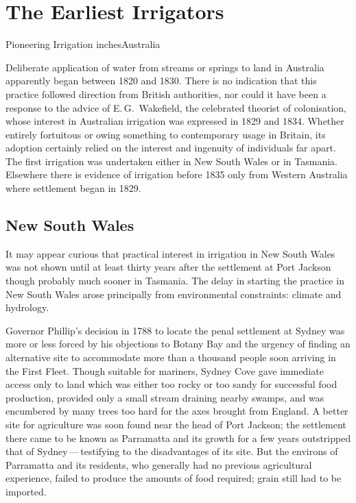 
\setcounter{endnote}{0}

\chapter{The Earliest Irrigators}
\label{ch:early}
{Pioneering Irrigation inchesAustralia}

Deliberate application of water from streams or springs to land in
Australia apparently began between 1820 and 1830.  There is no
indication that this practice followed direction from British
authorities, nor could it have been a response to the advice of
E.\,G.~Wakefield, the celebrated theorist of
colonisation, whose interest in Australian irrigation was expressed in
1829 and 1834.  Whether entirely fortuitous or owing something to
contemporary usage in Britain, its adoption certainly relied on the
interest and ingenuity of individuals far apart.  The first irrigation
was undertaken either in New South Wales or in Tasmania.  Elsewhere
there is evidence of irrigation before 1835 only from Western
Australia where settlement began in 1829.

\section*{\textsf{New South Wales}}
\label{sec:nsw}

It may appear curious that practical interest in irrigation in New
South Wales was not shown until at least thirty years after the
settlement at Port Jackson though probably much sooner in Tasmania.
The delay in starting the practice in New South Wales arose
principally from environmental constraints: climate and hydrology.

Governor Phillip's decision in 1788 to locate
the penal settlement at Sydney was more or less
forced by his objections to Botany Bay and the
urgency of finding an alternative site to accommodate more than a
thousand people soon arriving in the First Fleet.  Though suitable for
mariners, Sydney Cove gave immediate access only to land which was
either too rocky or too sandy for successful food production, provided
only a small stream draining nearby swamps, and was encumbered by many
trees too hard for the axes brought from England.  A better site for
agriculture was soon found near the head of Port Jackson; the settlement there came to be known as Parramatta
 and its growth for a few years outstripped that
of Sydney\,---\,testifying to the disadvantages of its site.  But the
environs of Parramatta and its residents, who generally had no
previous agricultural experience, failed to produce the amounts of
food required; grain still had to be imported.

